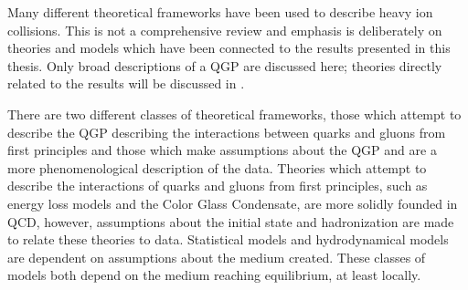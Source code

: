 Many different theoretical frameworks have been used to describe heavy ion collisions.  This is not a comprehensive review and emphasis is deliberately on theories and models which have been connected to the results presented in this thesis.  Only broad descriptions of a QGP are discussed here; theories directly related to the results will be discussed in .

There are two different classes of theoretical frameworks, those which attempt to describe the QGP describing the interactions between quarks and gluons from first principles and those which make assumptions about the QGP and are a more phenomenological description of the data.  Theories which attempt to describe the interactions of quarks and gluons from first principles, such as energy loss models and the Color Glass Condensate, are more solidly founded in QCD, however, assumptions about the initial state and hadronization are made to relate these theories to data.  Statistical models and hydrodynamical models are dependent on assumptions about the medium created.  These classes of models both depend on the medium reaching equilibrium, at least locally.


